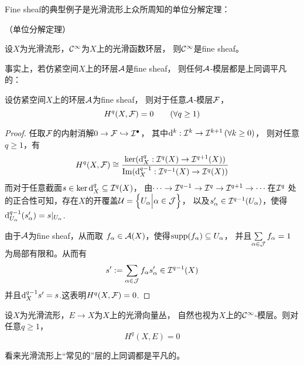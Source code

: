 Fine sheaf的典型例子是光滑流形上众所周知的单位分解定理：

\begin{example}（单位分解定理）

设$X$为光滑流形，$\mathcal{C}^\infty$为$X$上的光滑函数环层，
则$\mathcal{C}^\infty$是fine sheaf。
\end{example}


事实上，若仿紧空间$X$上的环层$\mathcal{A}$是fine sheaf，
则任何$\mathcal{A}$-模层都是上同调平凡的：

\begin{thm}
\label{fine sheaf 的上同调}
设仿紧空间$X$上的环层$\mathcal{A}$为fine sheaf，
则对于任意$\mathcal{A}$-模层$\mathcal{F}$，
$$H^q(X,\mathcal{F})=0\qquad (\forall q\geq 1)$$
\end{thm}

\begin{proof}
任取$\mathcal{F}$的内射消解$0\to\mathcal{F}\hookrightarrow\mathcal{I}^{\bullet}$，
其中$\mathrm{d}^k:\mathcal{I}^k\to\mathcal{I}^{k+1}\,(\forall k\geq 0)$，
则对任意$q\geq 1$，有
$$
  H^q(X,\mathcal{F})
\cong
  \frac{\ker(\mathrm{d}^{q}_X:\mathcal{I}^{q}(X)\to\mathcal{I}^{q+1}(X))}
       {\operatorname{Im}(\mathrm{d}^{q-1}_X:\mathcal{I}^{q-1}(X)\to\mathcal{I}^q(X))}
$$
而对于任意截面$s\in\ker\mathrm{d}^q_X\subseteq\mathcal{I}^q(X)$，
由$\cdots\to\mathcal{I}^{q-1}\to\mathcal{I}^q\to\mathcal{I}^{q+1}\to\cdots$在$\mathcal{I}^q$
处的正合性可知，存在$X$的开覆盖$\mathcal{U}=\Big\{ U_\alpha \Big| \alpha\in\mathcal{J} \Big\}$，
以及$s'_\alpha\in\mathcal{I}^{q-1}(U_\alpha)$，使得
$\mathrm{d}^{q-1}_{U_\alpha}(s'_\alpha)=s|_{U_\alpha}$.

由于$\mathcal{A}$为fine sheaf，从而取
$f_\alpha\in\mathcal{A}(X)$，使得$\operatorname{supp}(f_\alpha)\subseteq U_\alpha$，
并且$\sum\limits_{\alpha\in\mathcal{J}}f_\alpha=1$
为局部有限和。从而有
$$
  s':=
  \sum_{\alpha\in\mathcal{J}}
    f_\alpha s_\alpha'
\in\mathcal{I}^{q-1}(X)
$$
并且$\mathrm{d}^{q-1}_Xs'=s$.这表明$H^q(X,\mathcal{F})=0$.
\end{proof}

\begin{cor}设$X$为光滑流形，$E\to X$为$X$上的光滑向量丛，
自然也视为$X$上的$\mathcal{C}^\infty$-模层。则对任意$q\geq 1$，
$$H^q(X,E)=0$$
\end{cor}
看来光滑流形上“常见的”层的上同调都是平凡的。

